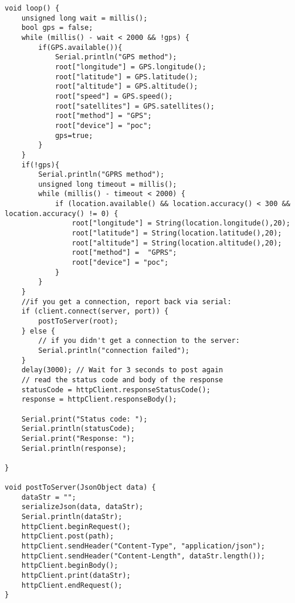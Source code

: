 \begin{verbatim}
void loop() {
	unsigned long wait = millis();
	bool gps = false;
	while (millis() - wait < 2000 && !gps) {
		if(GPS.available()){
			Serial.println("GPS method");
			root["longitude"] = GPS.longitude();
			root["latitude"] = GPS.latitude();
			root["altitude"] = GPS.altitude();
			root["speed"] = GPS.speed();
			root["satellites"] = GPS.satellites();
			root["method"] = "GPS";
			root["device"] = "poc";
			gps=true;
		}
	}
	if(!gps){
		Serial.println("GPRS method");
		unsigned long timeout = millis();
		while (millis() - timeout < 2000) {
			if (location.available() && location.accuracy() < 300 && location.accuracy() != 0) {
				root["longitude"] = String(location.longitude(),20);
				root["latitude"] = String(location.latitude(),20);
				root["altitude"] = String(location.altitude(),20);
				root["method"] =  "GPRS";
				root["device"] = "poc";
			}
		}
	}
	//if you get a connection, report back via serial:
	if (client.connect(server, port)) {
		postToServer(root);
	} else {
		// if you didn't get a connection to the server:
		Serial.println("connection failed");
	}
	delay(3000); // Wait for 3 seconds to post again
	// read the status code and body of the response
	statusCode = httpClient.responseStatusCode();
	response = httpClient.responseBody();
	
	Serial.print("Status code: ");
	Serial.println(statusCode);
	Serial.print("Response: ");
	Serial.println(response);
	
}

void postToServer(JsonObject data) {
	dataStr = "";
	serializeJson(data, dataStr);
	Serial.println(dataStr);
	httpClient.beginRequest();
	httpClient.post(path);
	httpClient.sendHeader("Content-Type", "application/json");
	httpClient.sendHeader("Content-Length", dataStr.length());
	httpClient.beginBody();
	httpClient.print(dataStr);
	httpClient.endRequest();
}
\end{verbatim}
